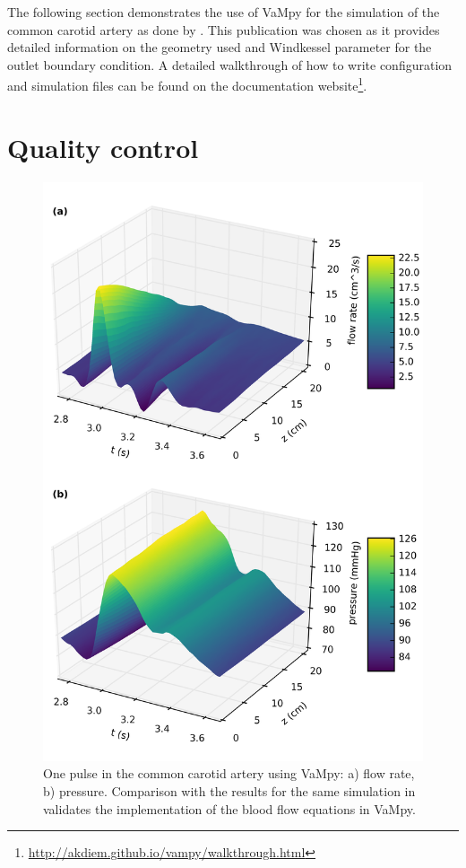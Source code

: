 \documentclass{jors}
\begin{document}
The following section demonstrates the use of VaMpy for the simulation of the common carotid artery as done by \cite{Kolachalama2007}. This publication was chosen as it provides detailed information on the geometry used and Windkessel parameter for the outlet boundary condition. A detailed walkthrough of how to write configuration and simulation files can be found on the documentation website\footnote{\url{http://akdiem.github.io/vampy/walkthrough.html}}.

\section*{Quality control}

\begin{figure}
  \center
  \includegraphics[width=\linewidth]{figures/cca_p_q.png}
  \caption{One pulse in the common carotid artery using VaMpy: a) flow rate, b) pressure. Comparison with the results for the same simulation in \cite{Kolachalama2007} validates the implementation of the blood flow equations in VaMpy.\label{fig:bifurcation}}
\end{figure}
\end{document}
